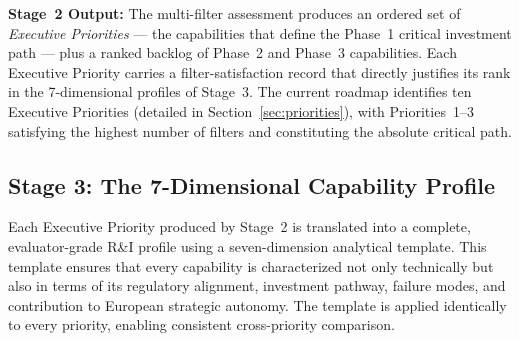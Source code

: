 \documentclass{ieeeaccess}
\begin{document}
\noindent\textbf{Stage~2 Output:} The multi-filter assessment produces an
ordered set of \emph{Executive Priorities} --- the capabilities that define
the Phase~1 critical investment path --- plus a ranked backlog of Phase~2 and
Phase~3 capabilities. Each Executive Priority carries a filter-satisfaction
record that directly justifies its rank in the 7-dimensional profiles of
Stage~3. The current roadmap identifies ten Executive Priorities (detailed
in Section~\ref{sec:priorities}), with Priorities~1--3 satisfying the
highest number of filters and constituting the absolute critical path.

\subsection{Stage 3: The 7-Dimensional Capability Profile}
\label{sec:7dim}
Each Executive Priority produced by Stage~2 is translated into a complete,
evaluator-grade R\&I profile using a seven-dimension analytical template.
This template ensures that every capability is characterized not only
technically but also in terms of its regulatory alignment, investment
pathway, failure modes, and contribution to European strategic autonomy.
The template is applied identically to every priority, enabling consistent
cross-priority comparison.
\end{document}
